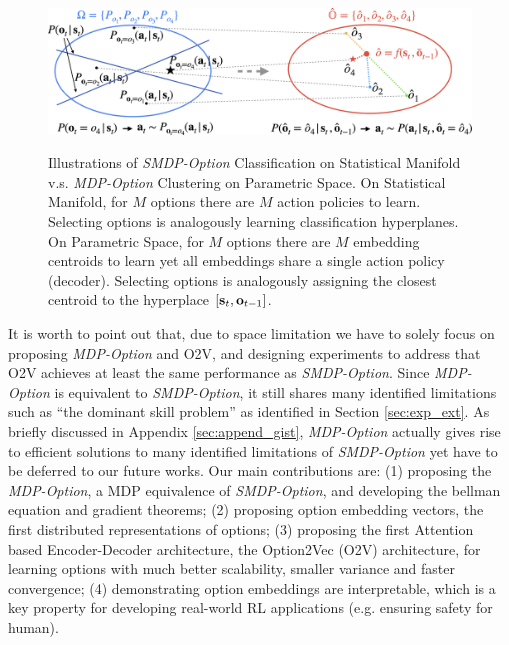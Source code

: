 \documentclass{article}
\newcommand{\red}[1]{\textcolor[HTML]{EB4335}{#1}}
\newcommand{\blue}[1]{\textcolor[HTML]{4285F4}{#1}}
\begin{document}
\begin{figure}[h!]
  \vspace{-4mm} \centering
  \includegraphics[width=0.9\linewidth]{figures/O2V_Manifold.png}\\
  \vspace{-1mm} \centering
  \caption{\label{fig:o2v_manifold} Illustrations of
    \blue{\emph{SMDP-Option} Classification} on \blue{Statistical
      Manifold} v.s. \red{\emph{MDP-Option} Clustering} on
    \red{Parametric Space}. On Statistical Manifold, for $M$
    options there are \blue{$M$ action policies} to learn.
    Selecting options is analogously \blue{learning
      classification hyperplanes}. On Parametric Space, for $M$
    options there are \red{$M$ embedding centroids} to learn yet
    all embeddings \red{share a single action policy (decoder)}.
    Selecting options is analogously \red{assigning the closest
      centroid to the hyperplace $[{\mathbf{s}}_t,{\mathbf{o}}_{t-1}]$}.}
  \vspace{-5.5mm}
\end{figure}

It is worth to point out that, due to space limitation we have to
solely focus on proposing \emph{MDP-Option} and O2V, and
designing experiments to address that O2V achieves at least the
same performance as \emph{SMDP-Option}. Since \emph{MDP-Option}
is equivalent to \emph{SMDP-Option}, it still shares many
identified limitations such as ``the dominant skill problem''
\cite{vezhnevets2017feudal,zhang2019dac} as identified in Section
\ref{sec:exp_ext}. As briefly discussed in Appendix
\ref{sec:append_gist}, \emph{MDP-Option} actually gives rise to
efficient solutions to many identified limitations of
\emph{SMDP-Option} yet have to be deferred to our future works.
Our main contributions are: (1) proposing the \emph{MDP-Option},
a MDP equivalence of \emph{SMDP-Option}, and developing the
bellman equation and gradient theorems; (2) proposing option
embedding vectors, the first distributed representations of
options; (3) proposing the first Attention
\cite{vaswani2017attention} based Encoder-Decoder architecture,
the Option2Vec (O2V) architecture, for learning options with much
better scalability, smaller variance and faster convergence; (4)
demonstrating option embeddings are interpretable, which is a key
property for developing real-world RL applications (e.g. ensuring
safety for human).
\end{document}
